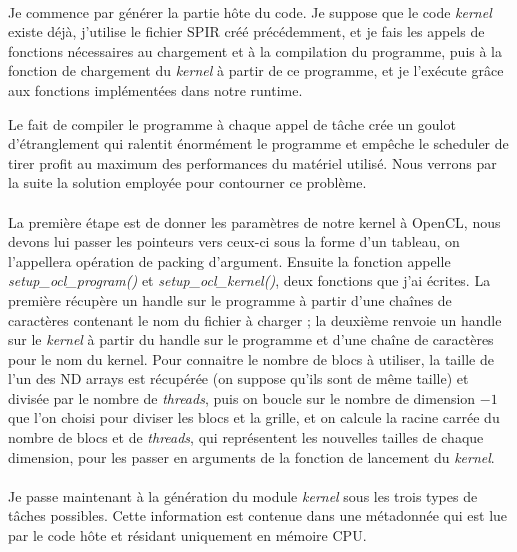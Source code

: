 \paragraph{}
Je commence par générer la partie hôte du code. Je suppose que le code
\emph{kernel} existe déjà, j'utilise le fichier SPIR créé précédemment, et je
fais les appels de fonctions nécessaires au chargement et à la compilation du
programme, puis à la fonction de chargement du \emph{kernel} à partir de ce
programme, et je l'exécute grâce aux fonctions implémentées dans notre runtime.

Le fait de compiler le programme à chaque appel de tâche crée un goulot
d'étranglement qui ralentit énormément le programme et empêche le scheduler de
tirer profit au maximum des performances du matériel utilisé. Nous verrons par
la suite la solution employée pour contourner ce problème.

\paragraph{}
La première étape est de donner les paramètres de notre kernel à OpenCL, nous
devons lui passer les pointeurs vers ceux-ci sous la forme d’un tableau, on
l'appellera opération de packing d’argument. Ensuite la fonction
appelle \emph{setup\_ocl\_program()} et \emph{setup\_ocl\_kernel()}, deux
fonctions que j’ai écrites. La première récupère un handle sur le programme à
partir d'une chaînes de caractères contenant le nom du fichier à charger ; la
deuxième renvoie un handle sur le \emph{kernel} à partir du handle sur le
programme et d'une chaîne de caractères pour le nom du kernel. Pour connaitre le
nombre de blocs à utiliser, la taille de l’un des ND arrays est récupérée (on
suppose qu’ils sont de même taille) et divisée par le nombre de \emph{threads},
puis on boucle sur le nombre de dimension $-1$ que l'on choisi pour diviser les
blocs et la grille, et on calcule la racine carrée du nombre de blocs et de
\emph{threads}, qui représentent les nouvelles tailles de chaque dimension, pour
les passer en arguments de la fonction de lancement du \emph{kernel}.

\paragraph{}
Je passe maintenant à la génération du module \emph{kernel} sous les trois types
de tâches possibles.  Cette information est contenue dans une métadonnée qui est
lue par le code hôte et résidant uniquement en mémoire CPU.

